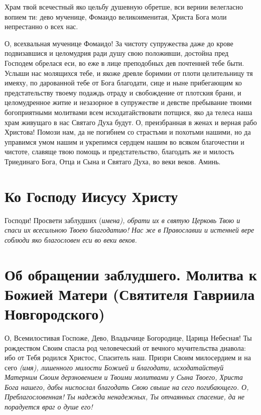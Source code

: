 
 Храм твой всечестный яко цельбу душевную обретше, вси вернии велегласно вопием ти: дево мученице, Фомаидо великоименитая, Христа Бога моли непрестанно о всех нас.



 О, всехвальная мученице Фомаидо! За чистоту супружества даже до крове подвизавшися и целомудрия ради душу свою положивши, достойна пред Господем обрелася еси, во еже в лице преподобных дев почтенней тебе быти. Услыши нас молящихся тебе, и якоже древле боримии от плоти целительницу тя имеяху, по дарованной тебе от Бога благодати, сице и ныне прибегающим ко предстательству твоему подаждь отраду и свобождение от плотския брани, и целомудренное житие и незазорное в супружестве и девстве пребывание твоими богоприятными молитвами всем исходатайствовати потщися, яко да телеса наша храм живущаго в нас Святаго Духа будут. О, преизбранная в женах и верная рабо Христова! Помози нам, да не погибнем со страстьми и похотьми нашими, но да управимся умом нашим и укрепимся сердцем нашим во всяком благочестии и чистоте, славяще твою помощь и предстательство, благодать же и милость Триединаго Бога, Отца и Сына и Святаго Духа, во веки веков. Аминь. 
\mychapterending


 

\section{Ко Господу Иисусу Христу}
 


Господи! Просвети заблудших (\itshape имена\normalfont{}), обрати их в святую Церковь Твою и спаси их всесильною Твоею благодатию! Нас же в Православии и истенней вере соблюди яко благословен еси во веки веков.


\section{Об обращении заблудшего.  Молитва к Божией Матери  (Святителя Гавриила Новгородского)}

{\noparindent\begin{minipage}{\textwidth}
 
\restoreparindent{}
О, Всемилостивая Госпоже, Дево, Владычице Богородице, Царица Небесная! Ты рождеством Своим спасла род человеческий от вечного мучительства диавола: ибо от Тебя родился Христос, Спаситель наш. Призри Своим милосердием и на сего \itshape (имя)\normalfont{}, лишенного милости Божией и благодати, исходатайствуй Матерним Своим дерзновением и Твоими молитвами у Сына Твоего, Христа Бога нашего, дабы ниспослал благодать Свою свыше на сего погибающего. О, Преблагословенная! Ты надежда ненадежных, Ты отчаянных спасение, да не порадуется враг о душе его! 

\end{minipage}}
\bigskip\bigskip
\mychapterending

